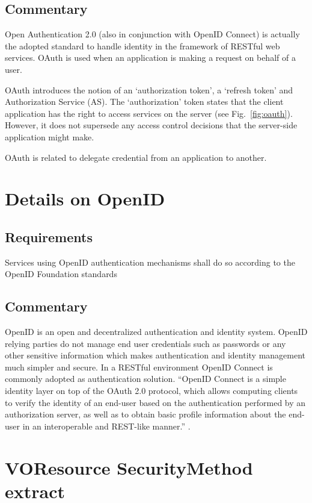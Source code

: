\documentclass[11pt,a4paper]{ivoa}
\begin{document}
\subsection{Commentary}
Open Authentication 2.0 (also in conjunction with OpenID Connect) is actually the adopted standard 
to handle identity in the framework of RESTful web services. 
OAuth is used when an application is making a request on behalf of a user.

OAuth introduces the notion of an `authorization token', a `refresh token' and Authorization Service (AS). 
The `authorization' token states that the client application has the right to access services on the server  (see Fig.~\ref{fig:oauth}). 
However, it does not supersede any access control decisions that the server-side application might make.

OAuth is related to delegate credential from an application to another.

\section{Details on OpenID}
\subsection{Requirements}
Services using OpenID authentication mechanisms shall do so according to the OpenID Foundation standards \citep{std:openid}
  
\subsection{Commentary}
OpenID is an open and decentralized authentication and identity system. OpenID relying parties do not manage end user credentials 
such as passwords or any other sensitive information which makes authentication and identity management much simpler and secure.
In a RESTful environment OpenID Connect \citep{std:openidconnect} is commonly adopted as authentication solution. ``OpenID Connect  is a simple identity 
layer on top of the OAuth 2.0 protocol, which allows computing clients to verify the identity of an end-user based on the authentication
 performed by an authorization server, as well as to obtain basic profile information about the end-user in an interoperable and REST-like manner.'' \citep{std:openid}.
  
\appendix 
\section{VOResource  SecurityMethod extract}
\end{document}
